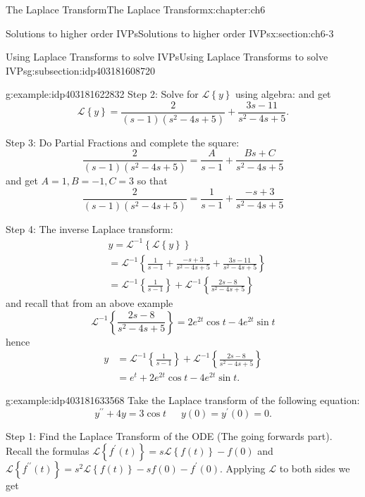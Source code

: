 \documentclass[oneside,10pt,]{book}
\numberwithin{equation}{section}
\numberwithin{equation}{section}
\newcommand{\amp}{&}
\begin{document}
\begin{chapterptx}{The Laplace Transform}{}{The Laplace Transform}{}{}{x:chapter:ch6}
\begin{sectionptx}{Solutions to higher order IVPs}{}{Solutions to higher order IVPs}{}{}{x:section:ch6-3}
\begin{subsectionptx}{Using Laplace Transforms to solve IVPs}{}{Using Laplace Transforms to solve IVPs}{}{}{g:subsection:idp403181608720}
\begin{example}{}{g:example:idp403181622832}
Step 2: Solve for \(\mathcal{L}\left\{ y\right\} \) using algebra: and get%
\begin{equation*}
\mathcal{L}\left\{ y\right\} =\frac{2}{\left(s-1\right)\left(s^{2}-4s+5\right)}+\frac{3s-11}{s^{2}-4s+5}.
\end{equation*}
%
\par
Step 3: Do Partial Fractions and complete the square:%
\begin{equation*}
\frac{2}{\left(s-1\right)\left(s^{2}-4s+5\right)}=\frac{A}{s-1}+\frac{Bs+C}{s^{2}-4s+5}
\end{equation*}
and get \(A=1,B=-1,C=3\) so that%
\begin{equation*}
\frac{2}{\left(s-1\right)\left(s^{2}-4s+5\right)}=\frac{1}{s-1}+\frac{-s+3}{s^{2}-4s+5}
\end{equation*}
%
\par
Step 4: The inverse Laplace transform:%
\begin{align*}
\amp y=\mathcal{L}^{-1}\left\{ \mathcal{L}\left\{ y\right\} \right\} \\
\amp =\mathcal{L}^{-1}\left\{ \frac{1}{s-1}+\frac{-s+3}{s^{2}-4s+5}+\frac{3s-11}{s^{2}-4s+5}\right\} \\
\amp =\mathcal{L}^{-1}\left\{ \frac{1}{s-1}\right\} +\mathcal{L}^{-1}\left\{ \frac{2s-8}{s^{2}-4s+5}\right\} 
\end{align*}
and recall that from an above example%
\begin{equation*}
\mathcal{L}^{-1}\left\{ \frac{2s-8}{s^{2}-4s+5}\right\} =2e^{2t}\cos t-4e^{2t}\sin t
\end{equation*}
hence%
\begin{align*}
y \amp =\mathcal{L}^{-1}\left\{ \frac{1}{s-1}\right\} +\mathcal{L}^{-1}\left\{ \frac{2s-8}{s^{2}-4s+5}\right\} \\
\amp =e^{t}+2e^{2t}\cos t-4e^{2t}\sin t.
\end{align*}
%
\end{example}
\begin{example}{}{g:example:idp403181633568}%
Take the Laplace transform of the following equation:%
\begin{equation*}
y^{\prime\prime}+4y=3\cos t\,\,\,\,\,\,\,\,\,y(0)=y^{\prime}(0)=0.
\end{equation*}
%
\par
Step 1: Find the Laplace Transform of the ODE (The going forwards part). Recall the formulas \(\mathcal{L}\left\{ f^{\prime}(t)\right\} =s\mathcal{L}\left\{ f(t)\right\} -f(0)\) and \(\mathcal{L}\left\{ f^{\prime\prime}(t)\right\} =s^{2}\mathcal{L}\left\{ f(t)\right\} -sf(0)-f^{\prime}(0)\). Applying \(\mathcal{L}\) to both sides we get%

\end{example}
\end{subsectionptx}
\end{sectionptx}
\end{chapterptx}
\end{document}
